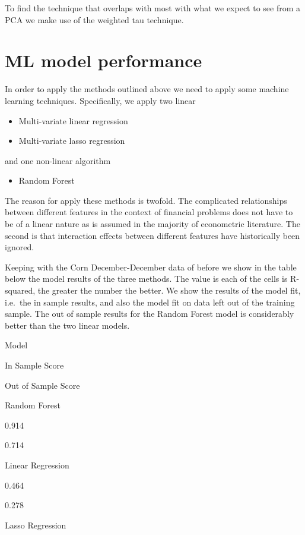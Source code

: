\documentclass[
]{book}
\providecommand{\tightlist}{%
  \setlength{\itemsep}{0pt}\setlength{\parskip}{0pt}}
\begin{document}
To find the technique that overlaps with most with what we expect to see from a PCA we make use of the weighted tau technique.

\hypertarget{ml-model-performance}{%
\section{ML model performance}\label{ml-model-performance}}

In order to apply the methods outlined above we need to apply some machine learning techniques. Specifically, we apply two linear

\begin{itemize}
\tightlist
\item
  Multi-variate linear regression
\item
  Multi-variate lasso regression
\end{itemize}

and one non-linear algorithm

\begin{itemize}
\tightlist
\item
  Random Forest
\end{itemize}

The reason for apply these methods is twofold. The complicated relationships between different features in the context of financial problems does not have to be of a linear nature as is assumed in the majority of econometric literature. The second is that interaction effects between different features have historically been ignored.

Keeping with the Corn December-December data of before we show in the table below the model results of the three methods. The value is each of the cells is R-squared, the greater the number the better. We show the results of the model fit, i.e.~the in sample results, and also the model fit on data left out of the training sample. The out of sample results for the Random Forest model is considerably better than the two linear models.

Model

In Sample Score

Out of Sample Score

Random Forest

0.914

0.714

Linear Regression

0.464

0.278

Lasso Regression
\end{document}
